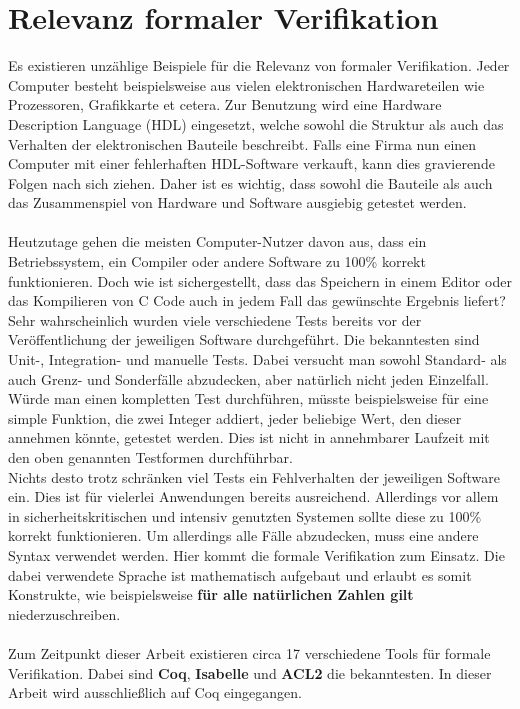 \section{Relevanz formaler Verifikation}
Es existieren unzählige Beispiele für die Relevanz von formaler Verifikation. Jeder Computer besteht beispielsweise aus vielen elektronischen Hardwareteilen wie Prozessoren, Grafikkarte et cetera. Zur Benutzung wird eine Hardware Description Language (HDL) eingesetzt, welche sowohl die Struktur als auch das Verhalten der elektronischen Bauteile beschreibt. Falls eine Firma nun einen Computer mit einer fehlerhaften HDL-Software verkauft, kann dies gravierende Folgen nach sich ziehen.
Daher ist es wichtig, dass sowohl die Bauteile als auch das Zusammenspiel von Hardware und Software ausgiebig getestet werden.\\
\\
Heutzutage gehen die meisten Computer-Nutzer davon aus, dass ein Betriebssystem, ein Compiler oder andere Software zu 100\% korrekt funktionieren. Doch wie ist sichergestellt, dass das Speichern in einem Editor oder das Kompilieren von C Code auch in jedem Fall das gewünschte Ergebnis liefert? \\
Sehr wahrscheinlich wurden viele verschiedene Tests bereits vor der Veröffentlichung der jeweiligen Software durchgeführt. Die bekanntesten sind Unit-, Integration- und manuelle Tests. Dabei versucht man sowohl Standard- als auch Grenz- und Sonderfälle abzudecken, aber natürlich nicht jeden Einzelfall. Würde man einen kompletten Test durchführen, müsste beispielsweise für eine simple Funktion, die zwei Integer addiert, jeder beliebige Wert, den dieser annehmen könnte, getestet werden. Dies ist nicht in annehmbarer Laufzeit mit den oben genannten Testformen durchführbar.\\
Nichts desto trotz schränken viel Tests ein Fehlverhalten der jeweiligen Software ein. Dies ist für vielerlei Anwendungen bereits ausreichend. Allerdings vor allem in sicherheitskritischen und intensiv genutzten Systemen sollte diese zu 100\% korrekt funktionieren.
Um allerdings alle Fälle abzudecken, muss eine andere Syntax verwendet werden. Hier kommt die formale Verifikation zum Einsatz. 
Die dabei verwendete Sprache ist mathematisch aufgebaut und erlaubt es somit Konstrukte, wie beispielsweise \textbf{für alle natürlichen Zahlen gilt} niederzuschreiben.\\
\\
Zum Zeitpunkt dieser Arbeit existieren circa 17 verschiedene Tools für formale Verifikation. Dabei sind \textbf{Coq}, \textbf{Isabelle} und \textbf{ACL2} die bekanntesten.\cite{WIEDIJK01:FP}
In dieser Arbeit wird ausschließlich auf Coq eingegangen.

